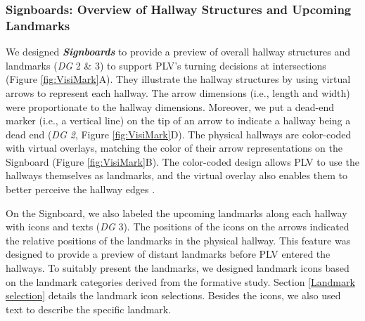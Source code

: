\subsubsection{Signboards: Overview of Hallway Structures and Upcoming Landmarks}

We designed \textbf{\textit{Signboards}} to provide a preview of overall hallway structures and landmarks (\textit{DG} 2 \& 3) to support PLV's turning decisions at intersections (Figure \ref{fig:VisiMark}A).  They illustrate the hallway structures by using virtual arrows to represent each hallway. The arrow dimensions (i.e., length and width) were proportionate to the hallway dimensions. Moreover, we put a dead-end marker (i.e., a vertical line) on the tip of an arrow to indicate a hallway being a dead end (\textit{DG 2}, Figure \ref{fig:VisiMark}D). The physical hallways are color-coded with virtual overlays, matching the color of their arrow representations on the Signboard (Figure \ref{fig:VisiMark}B). The color-coded design allows PLV to use the hallways themselves as landmarks, and the virtual overlay also enables them to better perceive the hallway edges . %

On the Signboard, we also labeled the upcoming landmarks along each hallway with icons and texts (\textit{DG} 3). The positions of the icons on the arrows indicated the relative positions of the landmarks in the physical hallway. %
This feature was designed to provide a preview of distant landmarks before PLV entered the hallways. To suitably present the landmarks, we designed landmark icons based on the landmark categories derived from the formative study. %
Section \ref{Landmark selection} details the landmark icon selections. Besides the icons, we also used text to describe the specific landmark.

